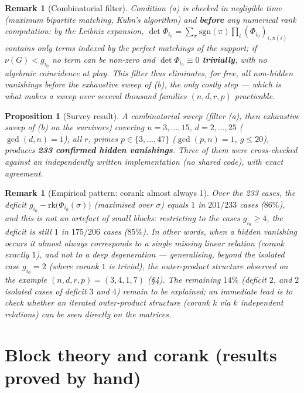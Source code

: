 \documentclass[11pt,a4paper]{article}
\newtheorem{proposition}[theorem]{Proposition}
\newtheorem{remark}[theorem]{Remark}
\begin{document}
\begin{remark}[Combinatorial filter]
Condition (a) is checked in negligible time (maximum bipartite matching,
Kuhn's algorithm) and \textbf{before} any numerical rank computation: by the
Leibniz expansion, $\det\Phi_{i_0}=\sum_\pi
\mathrm{sgn}(\pi)\prod_i(\Phi_{i_0})_{i,\pi(i)}$ contains only terms indexed by
the perfect matchings of the support; if $\nu(G)<g_{i_0}$ no term can be
non-zero and $\det\Phi_{i_0}\equiv0$ \textbf{trivially}, with no algebraic
coincidence at play. This filter thus eliminates, for free, all
non-\emph{hidden} vanishings before the exhaustive sweep of (b), the only costly
step --- which is what makes a sweep over several thousand families $(n,d,r,p)$
practicable.
\end{remark}

\begin{proposition}[Survey result]
A combinatorial sweep (filter (a), then exhaustive sweep of (b) on the
survivors) covering $n=3,\dots,15$, $d=2,\dots,25$ ($\gcd(d,n)=1$), all $r$,
primes $p\in\{3,\dots,47\}$ ($\gcd(p,n)=1$, $g\le20$), produces
\textbf{233 confirmed hidden vanishings}. Three of them were cross-checked
against an independently written implementation (no shared code), with exact
agreement.
\end{proposition}

\begin{remark}[Empirical pattern: corank almost always 1]
Over the 233 cases, the deficit $g_{i_0}-\mathrm{rk}\big(\Phi_{i_0}(\sigma)\big)$
(maximised over $\sigma$) equals $1$ in $201/233$ cases ($86\%$), and this is not
an artefact of small blocks: restricting to the cases $g_{i_0}\ge4$, the deficit
is still $1$ in $175/206$ cases ($85\%$). In other words, when a hidden
vanishing occurs it almost always corresponds to a single missing linear
relation (corank exactly $1$), and not to a deep degeneration --- generalising,
beyond the isolated case $g_{i_0}=2$ (where corank $1$ is trivial), the
outer-product structure observed on the example $(n,d,r,p)=(3,4,1,7)$ (\S4).
The remaining $14\%$ (deficit $2$, and $2$ isolated cases of deficit $3$ and
$4$) remain to be explained; an immediate lead is to check whether an iterated
outer-product structure (corank $k$ via $k$ independent relations) can be seen
directly on the matrices.
\end{remark}

\section{Block theory and corank (results proved by hand)}
\label{sec:blocs}
\end{document}
